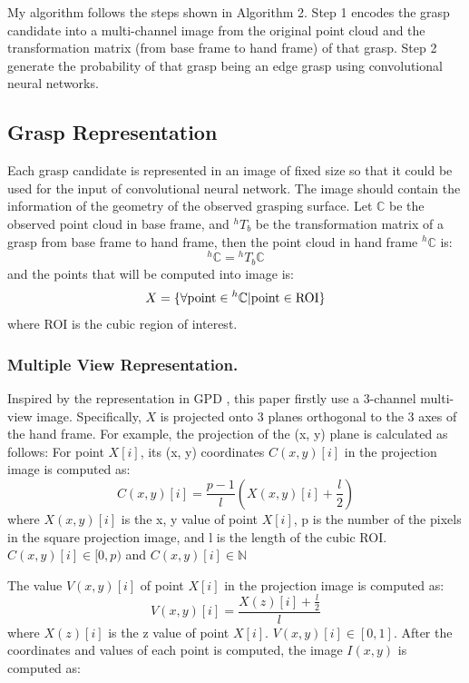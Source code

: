 \documentclass[letterpaper]{article} %
\begin{document}
My algorithm follows the steps shown in Algorithm 2. Step 1 encodes the grasp candidate into a multi-channel image from the original point cloud and the transformation matrix (from base frame to hand frame) of that grasp. Step 2 generate the probability of that grasp being an edge grasp using convolutional neural networks.

\subsection{Grasp Representation}
Each grasp candidate is represented in an image of fixed size so that it could be used for the input of convolutional neural network. The image should contain the information of the geometry of the observed grasping surface. Let $\mathbb{C}$ be the observed point cloud in base frame, and ${}^hT_b$ be the transformation matrix of a grasp from base frame to hand frame, then the point cloud in hand frame ${}^h\mathbb{C}$ is:
\begin{equation}
    {}^h\mathbb{C}={}^hT_b\mathbb{C}
\end{equation}
and the points that will be computed into image is:
\begin{equation}
    X=\{\forall {\rm point}\in {}^h\mathbb{C}|{\rm point}\in {\rm ROI}\}
\end{equation}
where ROI is the cubic region of interest.

\subsubsection{Multiple View Representation.}
Inspired by the representation in GPD \cite{RN6}, this paper firstly use a 3-channel multi-view image. Specifically, $X$ is projected onto 3 planes orthogonal to the 3 axes of the hand frame. For example, the projection of the (x, y) plane is calculated as follows:
For point $X[i]$, its (x, y) coordinates $C(x, y)[i]$ in the projection image is computed as:
\begin{equation}
    C(x, y)[i]=\frac{p-1}{l} (X(x, y)[i] + \frac {l} 2)
\end{equation}
where $X(x, y)[i]$ is the x, y value of point $X[i]$, p is the number of the pixels in the square projection image, and l is the length of the cubic ROI. $C(x, y)[i]\in [0, p)$ and $C(x, y)[i]\in \mathbb{N}$

The value $V(x, y)[i]$ of point $X[i]$ in the projection image is computed as:
\begin{equation}
    V(x, y)[i]=\frac{X(z)[i]+\frac{l}{2}}{l}
\end{equation}
where $X(z)[i]$ is the z value of point $X[i]$. $V(x, y)[i]\in [0, 1]$. After the coordinates and values of each point is computed, the image $I(x, y)$ is computed as:
\end{document}
